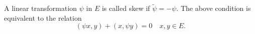 A linear transformation $\psi$ in $E$ is called skew if $\tilde{\psi} = -\psi$. The above condition is equivalent to the relation
$$(\psi x, y) + (x, \psi y) = 0 \quad x, y \in E.$$
